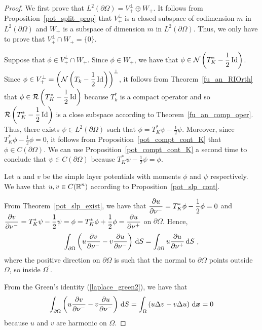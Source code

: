 \begin{proof}
 We first prove that
$\displaystyle L^2(\partial \Omega) = V_+^\perp \oplus W_+$.  It
follows from Proposition~\ref{pot_split_prop} that
$\displaystyle V_+^\perp$ is a
closed subspace of codimension $m$ in
$\displaystyle L^2(\partial \Omega)$ and $W_+$
is a subspace of dimension $m$ in
$\displaystyle L^2(\partial \Omega)$.  Thus, we
only have to prove that $\displaystyle V_+^\perp \cap W_+ = \{0\}$.

Suppose that $\displaystyle \phi \in V_+^\perp \cap W_+$.
Since $\phi \in W_+$, we have that
$\displaystyle \phi \in \mathcal{N} \left(T^\ast_K - \frac{1}{2} \operatorname{Id}\right)$.
Since $\displaystyle \phi \in V_+^\perp
= \left(\mathcal{N} \left(T_k -\frac{1}{2} \operatorname{Id}\right)\right)^\perp$,
it follows from Theorem~\ref{fu_an_RIOrth} that
$\displaystyle \phi \in \mathcal{R} \left( T^\ast_K - \frac{1}{2} \operatorname{Id}\right)$
because $\displaystyle T_k^\ast$ is a compact operator
and so $\displaystyle \mathcal{R} \left( T^\ast_K - \frac{1}{2} \operatorname{Id}\right)$
is a close subspace according to Theorem~\ref{fu_an_comp_oper}.  Thus, there
exists $\displaystyle \psi \in L^2(\partial \Omega)$ such that
$\displaystyle \phi = T^\ast_K \psi - \frac{1}{2} \psi$.  Moreover,
since $\displaystyle T^\ast_K\phi - \frac{1}{2} \phi = 0$, it follows
from Proposition~\ref{pot_compt_cont_K} that
$\phi \in C(\partial \Omega)$.  We can use 
Proposition~\ref{pot_compt_cont_K} a second time to conclude that
$\psi \in C(\partial \Omega)$ because
$\displaystyle T^\ast_K \psi - \frac{1}{2} \psi = \phi$.

Let $u$ and $v$ be the simple layer potentials with moments $\phi$ and
$\psi$ respectively.  We have that $\displaystyle u,v \in C(\mathbb{R}^n)$
according to Proposition~\ref{pot_slp_cont}.

From Theorem~\ref{pot_slp_exist}, we have
that
$\displaystyle \frac{\partial{u}}{\partial \nu^-} = T^\ast_K \phi - \frac{1}{2} \phi = 0$
and
$\displaystyle \frac{\partial{v}}{\partial \nu^-} = T^\ast_K \psi - \frac{1}{2} \psi
= \phi = T^\ast_K \phi + \frac{1}{2} \phi
= \frac{\partial{u}}{\partial \nu^+}$
on $\partial \Omega$.  Hence,
\begin{equation} \label{pot_L2_split1_E1}
\int_{\partial \Omega} \left( u \frac{\partial{v}}{\partial \nu^-}
- v \frac{\partial{u}}{\partial \nu^-} \right) \,\mathrm{d}{S}
= \int_{\partial \Omega} u \frac{\partial{u}}{\partial \nu^+} \,\mathrm{d}{S} \ ,
\end{equation}
where the positive direction on $\partial \Omega$ is such that the
normal to $\partial \Omega$ points outside $\Omega$, so inside
$\displaystyle \Omega^{\prime}$.

From the Green's identity (\ref{laplace_green2}), we have that
\begin{equation} \label{pot_L2_split1_E2}
\int_{\partial \Omega} \left( u \frac{\partial{v}}{\partial \nu^-}
- v \frac{\partial{u}}{\partial \nu^-} \right) \,\mathrm{d}{S}
= \int_\Omega \left( u \Delta v -  v \Delta u \right)
\,\mathrm{d}{{\bm{x}}} = 0
\end{equation}
because $u$ and $v$ are harmonic on $\Omega$.


\end{proof}
